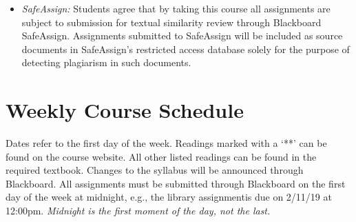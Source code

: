 \documentclass[article,oneside]{memoir}
\begin{document}
\begin{itemize}
\item \textit{SafeAssign:} Students agree that by taking this course all assignments are subject to submission for textual similarity review through Blackboard SafeAssign. Assignments submitted to SafeAssign will be included as source documents in SafeAssign's restricted access database solely for the purpose of detecting plagiarism in such documents.  


\end{itemize}




\section{Weekly Course Schedule}
Dates refer to the first day of the week. Readings marked with a `**' can be found on the course website. All other listed readings can be found in the required textbook. Changes to the syllabus will be announced through Blackboard.  All assignments must be submitted through Blackboard on the first day of the week at midnight, e.g., the library assignmentis due on 2/11/19 at 12:00pm. \emph{Midnight is the first moment of the day, not the last.}   \newline
\end{document}
